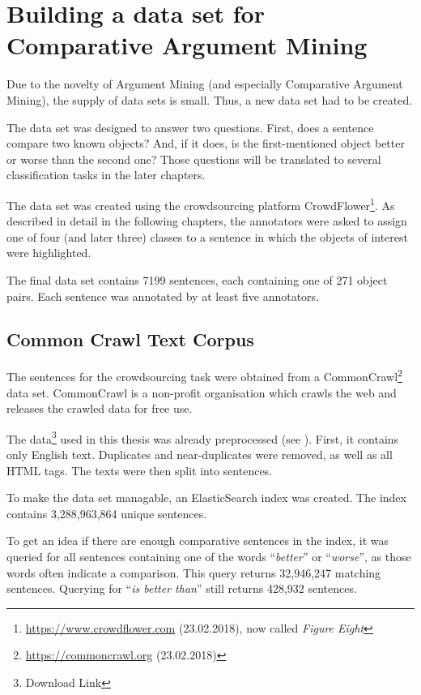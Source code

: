 \FloatBarrier
\chapter{Building a data set for Comparative Argument Mining}
\label{sec:prestudy}
Due to the novelty of Argument Mining (and especially Comparative Argument Mining), the supply of data sets is small. Thus, a new data set had to be created.

The data set was designed to answer two questions. First, does a sentence compare two known objects? And, if it does, is the first-mentioned object better or worse than the second one? Those questions will be translated to several classification tasks in the later chapters.

The data set was created using the crowdsourcing platform CrowdFlower\footnote{\url{https://www.crowdflower.com} (23.02.2018), now called \emph{Figure Eight}}. As described in detail in the following chapters, the annotators were asked to assign one of four (and later three) classes to a sentence in which the objects of interest were highlighted.

The final data set contains 7199 sentences, each containing one of 271 object pairs. Each sentence was annotated by at least five annotators.

\section{Common Crawl Text Corpus}
The sentences for the crowdsourcing task were obtained from a CommonCrawl\footnote{\url{https://commoncrawl.org} (23.02.2018)} data set. CommonCrawl is a non-profit organisation which crawls the web and releases the crawled data for free use.

The data\footnote{Download Link} used in this thesis was already preprocessed (see \cite{Panchenko:2017aa}). First, it contains only English text. Duplicates and near-duplicates were removed, as well as all HTML tags. The texts were then split into sentences.

To make the data set managable, an ElasticSearch index was created. The index contains 3,288,963,864 unique sentences.

To get an idea if there are enough comparative sentences in the index, it was queried for all sentences containing one of the words \enquote{\emph{better}} or \enquote{\emph{worse}},  as those words often indicate a comparison. This query returns 32,946,247 matching sentences. Querying for \enquote{\emph{is better than}} still returns 428,932 sentences.

